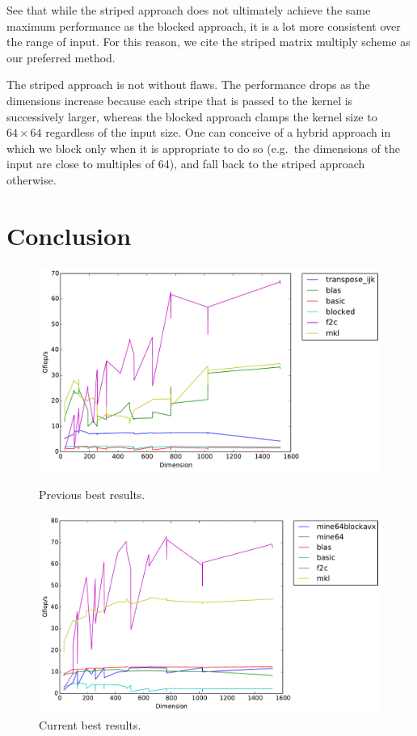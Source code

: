 \documentclass{scrartcl}
\begin{document}
  See that while the striped approach does not ultimately achieve the same maximum performance as the blocked approach, it is a lot more consistent over the range of input. For this reason, we cite the striped matrix multiply scheme as our preferred method.

  The striped approach is not without flaws. The performance drops as the dimensions increase because each stripe that is passed to the kernel is successively larger, whereas the blocked approach clamps the kernel size to $64 \times 64$ regardless of the input size. One can conceive of a hybrid approach in which we block only when it is appropriate to do so (e.g.~the dimensions of the input are close to multiples of 64), and fall back to the striped approach otherwise.
  \section{Conclusion}
  \begin{figure}[ht!]
    \centering

    \includegraphics[width=\textwidth]{timing-current-best}
    \caption{Previous best results.\label{fig:avx-prev}}

    \includegraphics[width=\textwidth]{timing-final-best}
    \caption{Current best results.\label{fig:avx-final}}
  \end{figure}
\end{document}
